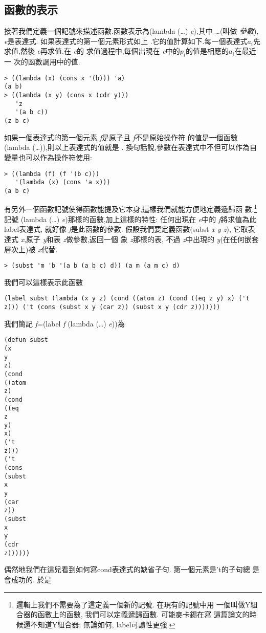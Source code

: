 \documentclass[12pt]{article}
\begin{document}
\begin{CJK}{UTF8}{bsmi}
\section{函數的表示} 
接著我們定義一個記號來描述函數.函數表示為(lambda 
(\pone\dots\pn) 
{\it 
e}),其中 
\pone\dots{}(叫做{\em 
參數}),{\it 
e}是表達式. 
如果表達式的第一個元素形式如上 
.它的值計算如下.每一個表達式{$a_{i}$}先求值,然後{\it 
e}再求值.在{\it 
e}的 
求值過程中,每個出現在{\it 
e}中的{$p_{i}$}的值是相應的{$a_{i}$}在最近一 
次的函數調用中的值. 
\begin{verbatim} 
> ((lambda (x) (cons x '(b))) 'a) 
(a b) 
> ((lambda (x y) (cons x (cdr y))) 
   'z 
   '(a b c)) 
(z b c) 
\end{verbatim} 
如果一個表達式的第一個元素{\it 
f}是原子且{\it 
f}不是原始操作符 
的值是一個函數(lambda 
(\pone\dots\pn)),則以上表達式的值就是 
. 
換句話說,參數在表達式中不但可以作為自變量也可以作為操作符使用: 
\begin{verbatim} 
> ((lambda (f) (f '(b c))) 
   '(lambda (x) (cons 'a x))) 
(a b c) 
\end{verbatim} 
有另外一個函數記號使得函數能提及它本身,這樣我們就能方便地定義遞歸函 
數.\footnote{邏輯上我們不需要為了這定義一個新的記號. 
在現有的記號中用 
一個叫做Y組合器的函數上的函數, 
我們可以定義遞歸函數. 
可能麥卡錫在寫 
這篇論文的時候還不知道Y組合器; 
無論如何, 
label可讀性更強.} 
記號 
(lambda 
(\pone\dots\pn) 
{\it 
e})那樣的函數,加上這樣的特性: 
任何出現在{\it 
e}中的{\it 
f}將求值為此label表達式, 
就好像{\it 
f}是此函數的參數. 
假設我們要定義函數(subst 
{\it 
x 
y 
z}), 
它取表達式{\it 
x},原子{\it 
y}和表{\it 
z}做參數,返回一個 
象{\it 
z}那樣的表, 
不過{\it 
z}中出現的{\it 
y}(在任何嵌套層次上)被{\it 
x}代替. 
\begin{verbatim} 
> (subst 'm 'b '(a b (a b c) d)) (a m (a m c) d) 
\end{verbatim} 
我們可以這樣表示此函數 
\begin{verbatim} 
(label subst (lambda (x y z) (cond ((atom z) (cond ((eq z y) x) ('t z))) ('t (cons (subst x y (car z)) (subst x y (cdr z))))))) 
\end{verbatim} 
我們簡記{\it 
f}=(label 
{\it 
f} 
(lambda 
(\pone\dots\pn) 
{\it 
e}))為 
\begin{verbatim} 
(defun subst 
(x 
y 
z) 
(cond 
((atom 
z) 
(cond 
((eq 
z 
y) 
x) 
('t 
z))) 
('t 
(cons 
(subst 
x 
y 
(car 
z)) 
(subst 
x 
y 
(cdr 
z)))))) 
\end{verbatim} 
偶然地我們在這兒看到如何寫cond表達式的缺省子句. 
第一個元素是't的子句總 
是會成功的. 
於是 

\end{CJK}
\end{document}
